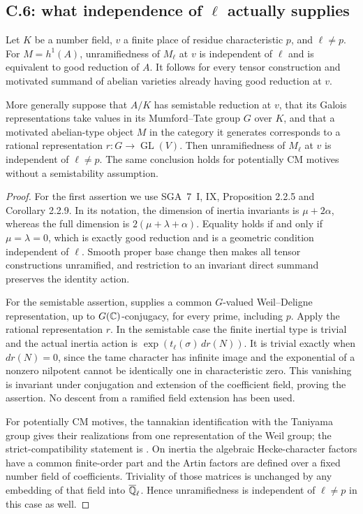 \subsection{C.6: what independence of \texorpdfstring{$\ell$}{ell} actually supplies}

\begin{proposition}
\label{c:ell-independence-cases}
Let $K$ be a number field, $v$ a finite place of residue characteristic $p$, and $\ell\ne p$.
For $M=h^1(A)$, unramifiedness of $M_\ell$ at $v$ is independent of $\ell$ and is equivalent to good reduction of $A$. It follows for every tensor construction and motivated summand of abelian varieties already having good reduction at $v$.

More generally suppose that $A/K$ has semistable reduction at $v$, that its Galois representations take values in its Mumford--Tate group $G$ over $K$, and that a motivated abelian-type object $M$ in the category it generates corresponds to a rational representation $r:G\to\operatorname{GL}(V)$. Then unramifiedness of $M_\ell$ at $v$ is independent of $\ell\ne p$. The same conclusion holds for potentially CM motives without a semistability assumption.
\end{proposition}

\begin{proof}
For the first assertion we use SGA~7~I, IX, Proposition 2.2.5 and Corollary 2.2.9. In its notation, the dimension of inertia invariants is $\mu+2\alpha$, whereas the full dimension is $2(\mu+\lambda+\alpha)$. Equality holds if and only if $\mu=\lambda=0$, which is exactly good reduction and is a geometric condition independent of $\ell$. Smooth proper base change then makes all tensor constructions unramified, and restriction to an invariant direct summand preserves the identity action.

For the semistable assertion, \citet[Theorem 1.2]{c_kisinzhou2025} supplies a common $G$-valued Weil--Deligne representation, up to $G(\mathbb C)$-conjugacy, for every prime, including $p$. Apply the rational representation $r$. In the semistable case the finite inertial type is trivial and the actual inertia action is $\exp(t_\ell(\sigma)\,dr(N))$. It is trivial exactly when $dr(N)=0$, since the tame character has infinite image and the exponential of a nonzero nilpotent cannot be identically one in characteristic zero. This vanishing is invariant under conjugation and extension of the coefficient field, proving the assertion. No descent from a ramified field extension has been used.

For potentially CM motives, the tannakian identification with the Taniyama group gives their realizations from one representation of the Weil group; the strict-compatibility statement is \citet[Remark 3, p.~262]{c_delignetaniyama1982}. On inertia the algebraic Hecke-character factors have a common finite-order part and the Artin factors are defined over a fixed number field of coefficients. Triviality of those matrices is unchanged by any embedding of that field into $\overline{\mathbb Q}_\ell$. Hence unramifiedness is independent of $\ell\ne p$ in this case as well.
\end{proof}

